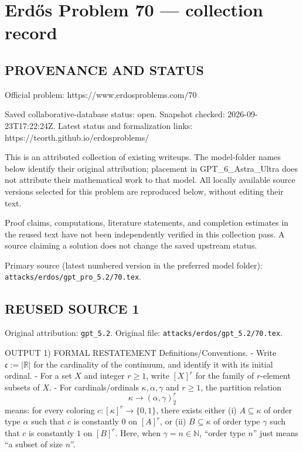 \section*{Erd\H{o}s Problem 70 --- collection record}

\subsection*{PROVENANCE AND STATUS}
Official problem: https://www.erdosproblems.com/70

Saved collaborative-database status: open.
Snapshot checked: 2026-09-23T17:22:24Z.
Latest status and formalization links: https://teorth.github.io/erdosproblems/

This is an attributed collection of existing writeups. The model-folder names below identify their original attribution; placement in GPT\_6\_Astra\_Ultra does not attribute their mathematical work to that model. All locally available source versions selected for this problem are reproduced below, without editing their text.

Proof claims, computations, literature statements, and completion estimates in the reused text have not been independently verified in this collection pass. A source claiming a solution does not change the saved upstream status.

Primary source (latest numbered version in the preferred model folder): \texttt{attacks/erdos/gpt\_pro\_5.2/70.tex}.

\subsection*{REUSED SOURCE 1}
Original attribution: \texttt{gpt\_5.2}.
Original file: \texttt{attacks/erdos/gpt\_5.2/70.tex}.


OUTPUT
1) FORMAL RESTATEMENT
Definitions/Conventions.
- Write $\mathfrak c:=|{\mathbb R}|$ for the cardinality of the continuum, and identify it with its initial ordinal.
- For a set $X$ and integer $r\ge 1$, write $[X]^r$ for the family of $r$-element subsets of $X$.
- For cardinals/ordinals $\kappa,\alpha,\gamma$ and $r\ge 1$, the partition relation
\[\kappa \to (\alpha,\gamma)^r_2\]
means: for every coloring $c:[\kappa]^r\to\{0,1\}$, there exists either
  (i) $A\subseteq \kappa$ of order type $\alpha$ such that $c$ is constantly $0$ on $[A]^r$, or
  (ii) $B\subseteq \kappa$ of order type $\gamma$ such that $c$ is constantly $1$ on $[B]^r$.
Here, when $\gamma=n\in\mathbb N$, ``order type $n$'' just means ``a subset of size $n$''.


